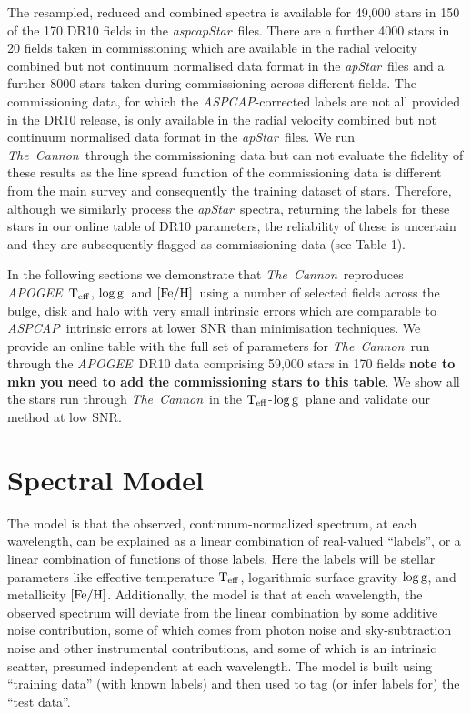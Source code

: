 \documentclass[12pt, preprint]{aastex}
\newcommand{\teff}{\mbox{$\rm T_{eff}$}}
\newcommand{\feh}{\mbox{$\rm [Fe/H]$}}
\newcommand{\logg}{\mbox{$\rm \log g$}}
\newcommand{\tc}{\textsl{The~Cannon}}
\newcommand{\apogee}{\textsl{APOGEE}}
\newcommand{\aspcap}{\textsl{ASPCAP}}
\newcommand{\aspcapstar}{\textsl{aspcapStar}}
\newcommand{\apstar}{\textsl{apStar}}
\begin{document}
The resampled, reduced and combined spectra is available for 49,000 stars in 150 of the 170 DR10 fields in the \aspcapstar\ files. There are a further 4000 stars in 20 fields taken in commissioning which are available in the radial velocity combined but not continuum normalised data format in the \apstar\ files and a further 8000 stars taken during commissioning across different fields. The commissioning data, for which the \aspcap-corrected labels are not all provided in the DR10 release, is only available in the radial velocity combined but not continuum normalised data format in the \apstar\ files. We run \tc\ through the commissioning data but can not evaluate the fidelity of these results as the line spread function of the commissioning data is different from the main survey and consequently the training dataset of stars. Therefore, although we similarly process the \apstar\ spectra, returning the labels for these stars in our online table of DR10 parameters, the reliability of these is uncertain and they are subsequently flagged as commissioning data (see Table 1).



In the following sections we demonstrate that \tc\ reproduces \apogee\ \teff, \logg\ and \feh\ using a number of selected fields across the bulge, disk and halo with very small intrinsic errors which are comparable to \aspcap\ intrinsic errors at lower SNR than minimisation techniques. We provide an online table with the full set of parameters for \tc\ run through the \apogee\ DR10 data comprising 59,000 stars in 170 fields \textbf{note to mkn you need to add the commissioning stars to this table}.  We show all the stars run through \tc\ in the \teff-\logg\ plane and validate our method at low SNR.



\section{Spectral Model}
\label{sec:spectralmodel}

The model is that the observed, continuum-normalized spectrum, at each
wavelength, can be explained as a linear combination of real-valued
``labels'', or a linear combination of functions of those labels.
Here the labels will be stellar parameters like effective temperature $\teff$,
logarithmic surface gravity $\logg$, and metallicity $\feh$.
Additionally, the model is that at each wavelength, the observed
spectrum will deviate from the linear combination by some additive
noise contribution, some of which comes from photon noise and
sky-subtraction noise and other instrumental contributions, and some
of which is an intrinsic scatter, presumed independent at each
wavelength.
The model is built using ``training data'' (with known labels) and then
used to tag (or infer labels for) the ``test data''.
\end{document}
